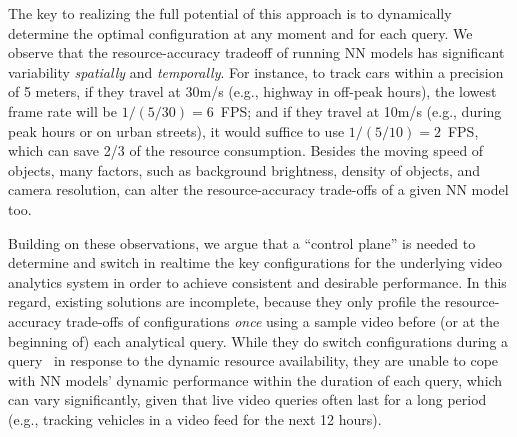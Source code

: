 \documentclass[letterpaper,twocolumn]{hotnets17}
\begin{document}
{%
The key to realizing the full potential of this approach is to  dynamically
determine the optimal configuration at any moment and for each query.
We observe that the resource-accuracy tradeoff of running NN models 
has significant variability {\em spatially} and {\em temporally}.
For instance, to track cars within a precision of 5 meters, if 
they travel at 30m/s (e.g., highway in off-peak hours), the lowest frame rate will be
$1/(5/30)=6$~FPS; and if they travel at 10m/s (e.g., during peak hours or 
on urban streets), 
it would suffice to use $1/(5/10)=2$~FPS, which can save 2/3 
of the resource consumption.
Besides the moving speed of objects, many factors, such as 
background brightness, density of objects, and camera resolution, 
can alter the resource-accuracy trade-offs of a given NN model too. 

Building on these observations, we argue that
a ``control plane'' is needed to determine and switch in realtime
the key configurations for the underlying video analytics system 
in order to achieve consistent and desirable performance.
In this regard, existing solutions are incomplete, 
because they only profile the resource-accuracy trade-offs of 
configurations {\em once} using a sample video before
(or at the beginning of) each analytical query.
While they do switch configurations during a 
query~\cite{videostorm,noscope,vigil,mcdnn} in response to 
the dynamic resource availability, they are unable to cope with
NN models' dynamic performance within the duration of each 
query, which can vary significantly, 
given that live video queries often last for a long period 
(e.g., tracking vehicles in a video feed for the next 12 hours).



}
\end{document}
